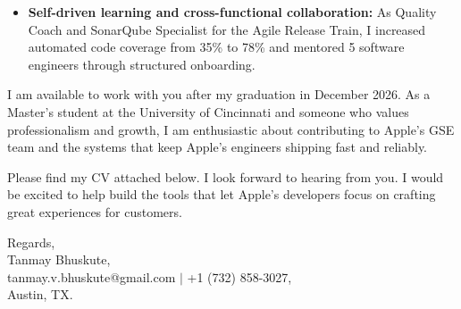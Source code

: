 \documentclass[11pt]{letter}
\begin{document}
\begin{letter}{}
\begin{itemize}[leftmargin=*, itemsep=0.45em]
    \item \textbf{Self-driven learning and cross-functional collaboration:} As Quality Coach and SonarQube Specialist for the Agile Release Train, I increased automated code coverage from 35\% to 78\% and mentored 5 software engineers through structured onboarding.
\end{itemize}

I am available to work with you after my graduation in December 2026. As a Master's student at the University of Cincinnati and someone who values professionalism and growth, I am enthusiastic about contributing to Apple's GSE team and the systems that keep Apple's engineers shipping fast and reliably.

Please find my CV attached below. I look forward to hearing from you. I would be excited to help build the tools that let Apple's developers focus on crafting great experiences for customers.

{\setlength{\parskip}{0pt}
Regards,\\
Tanmay Bhuskute,\\
tanmay.v.bhuskute@gmail.com $\mid$ +1 (732) 858-3027,\\
Austin, TX.
}

\end{letter}
\end{document}
